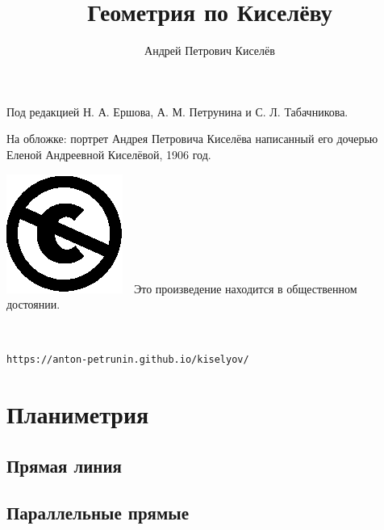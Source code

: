 \documentclass[twoside]{book}
\begin{document}


\cleardoublepage
\frontmatter
\title{Геометрия по Киселёву}
\author{Андрей Петрович Киселёв}
\date{}
\maketitle

\thispagestyle{empty}

Под редакцией Н. А. Ершова, А. М. Петрунина и С. Л. Табачникова.

На обложке: портрет  Андрея Петровича Киселёва написанный его дочерью Еленой Андреевной Киселёвой, 1906 год.

\vfill

\noindent
\includegraphics[scale=.25]{eps/Cc-public_domain_mark_white}\ \ 
Это произведение находится в общественном достоянии.

\ 

\noindent\texttt{https://anton-petrunin.github.io/kiselyov/} 

\mainmatter




\part{Планиметрия}

\chapter{Прямая линия}





\chapter{Параллельные прямые}









\end{document}

